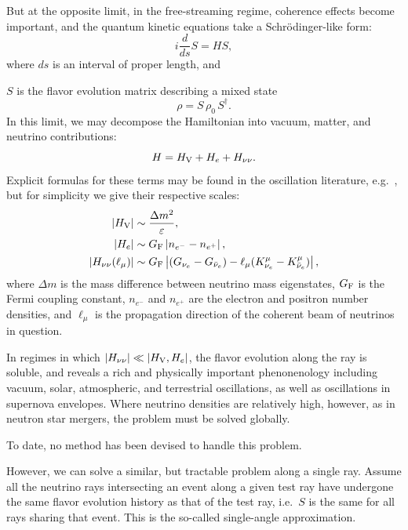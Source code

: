 \documentclass[aps,floatfix,prd,superscriptaddress,twocolumn]{revtex4-1}
\newcommand{\todo}[1]{\marginpar{\tiny{\textcolor{red}{#1}}}}
\renewcommand\todo[1]{} %
\begin{document}
But at the opposite limit, in the free-streaming regime,
coherence effects become important,
and the quantum kinetic equations take a Schr\"{o}dinger-like form:
\begin{equation}
  \label{eqn:schroedinger}
  i \frac{d}{ds} S = H S,
\end{equation}
where $ds$ is an interval of proper length, and
\todo{mention $\bar{\nu}$ eqn}
$S$ is the flavor evolution matrix describing a mixed state
\begin{equation}
  \label{eq:density_evolution}
  \rho = S \, \rho_0 \, S^\dagger.
\end{equation}
In this limit, we may decompose the Hamiltonian into vacuum,
matter, and neutrino contributions:
\begin{equation}
  \label{eqn:decompose_H}
  H = H_{\rm V} + H_e + H_{\nu\nu}.
\end{equation}
Explicit formulas for these terms may be found in the oscillation literature,
e.g.\ \cite{duan2009-review},
but for simplicity we give their respective scales:
\begin{align}
  \label{eqn:scale_H_V}
  |H_{\rm V}| &\sim \frac{\Delta m^2}{\varepsilon}, \\
  \label{eqn:scale_H_e}
  |H_e|       &\sim G_{\rm F}\left|n_{e^-}-n_{e^+}\right|, \\
  \label{eqn:scale_H_nunu}
  |H_{\nu\nu}(\ell_\mu)|&\sim G_{\rm F} \left|
  (G_{\nu_e}-G_{\bar{\nu}_e}) - \ell_\mu(K_{\nu_e}^\mu-K_{\bar{\nu}_e}^\mu)
  \right|,
\end{align}
where $\Delta m$ is the mass difference between neutrino mass eigenstates,
$G_{\rm F}$ is the Fermi coupling constant,
$n_{e^-}$ and $n_{e^+}$ are the electron and positron number densities,
and $\ell_\mu$ is the propagation direction of the
coherent beam of neutrinos in question.

In regimes in which $|H_{\nu\nu}|\ll|H_{\rm V},H_e|$,
the flavor evolution along the ray is soluble, and reveals a rich
and physically important phenonenology including
vacuum, solar, atmospheric, and terrestrial oscillations,
as well as oscillations in supernova envelopes.
Where neutrino densities are relatively high, however,
as in neutron star mergers, the problem must be solved globally.
\todo{be clearer}
To date, no method has been devised to handle this problem.

However, we can solve a similar, but tractable problem along a single ray.
Assume all the neutrino rays intersecting an event along a given test ray
have undergone the same flavor evolution history as that of the test ray,
i.e.\ $S$ is the same for all rays sharing that event.
This is the so-called single-angle approximation.
\todo{cite someone}
\todo{say something about its validity}
\end{document}
